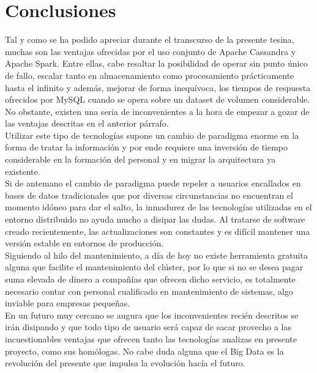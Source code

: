 
\pagestyle{fancy}

\chapter{Conclusiones}
\label{conclusiones}

Tal y como se ha podido apreciar durante el transcurso de la presente tesina, muchas son las ventajas ofrecidas por el uso conjunto de Apache Cassandra y Apache Spark. Entre ellas, cabe resaltar la posibilidad de operar sin punto único de fallo, escalar tanto en almacenamiento como procesamiento prácticamente hasta el infinito y además, mejorar de forma inequívoca, los tiempos de respuesta ofrecidos por MySQL cuando se opera sobre un dataset de volumen considerable.\\

No obstante, existen una seria de inconvenientes a la hora de empezar a gozar de las ventajas descritas en el anterior párrafo.\\

Utilizar este tipo de tecnologías supone un cambio de paradigma enorme en la forma de tratar la información y por ende requiere una inversión de tiempo considerable en la formación del personal y en migrar la arquitectura ya existente.\\

Si de antemano el cambio de paradigma puede repeler a usuarios encallados en bases de datos tradicionales que por diversas circunstancias no encuentran el momento idóneo para dar el salto, la inmadurez de las tecnologías utilizadas en el entorno distribuido no ayuda mucho a disipar las dudas. Al tratarse de software creado recientemente, las actualizaciones son constantes y es difícil mantener una versión estable en entornos de producción.\\

Siguiendo al hilo del mantenimiento, a día de hoy no existe herramienta gratuita alguna que facilite el mantenimiento del clúster, por lo que si no se desea pagar suma elevada de dinero a compañías que ofrecen dicho servicio, es totalmente necesario contar con personal cualificado en mantenimiento de sistemas, algo inviable para empresas pequeñas.\\

En un futuro muy cercano se augura que los inconvenientes recién descritos se irán disipando y que todo tipo de usuario será capaz de sacar provecho a las incuestionables ventajas que ofrecen tanto las tecnologías analizas en presente proyecto, como sus homólogas. No cabe duda alguna que el Big Data es la revolución del presente que impulsa la evolución hacía el futuro.

